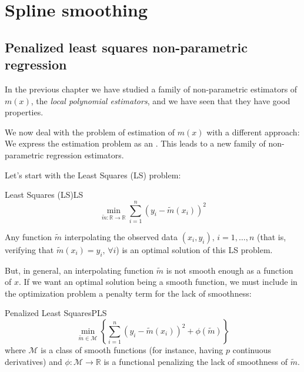 \chapter{Spline smoothing}

\section{Penalized least squares non-parametric regression}

In the previous chapter we have studied a family of non-parametric
estimators of $m(x)$, the \emph{local  polynomial estimators}, and
we have seen that they have good properties.

We now deal with the problem of estimation of $m(x)$ with a different
approach: We express the estimation problem as
an . This leads
to a new family of non-parametric regression estimators.

Let's start with the Least Squares (LS) problem:
\begin{problem}{Least Squares (LS)}{LS}
    \begin{equation*}
        \min_{\tilde m : \mathbb{R} \to \mathbb{R}}
            \sum_{i=1}^n \left(y_i - \tilde m(x_i)\right)^2
    \end{equation*}
\end{problem}

Any function $\tilde m$ interpolating the observed data $(x_i, y_i),\,i=1,\ldots,n$
(that is, verifying that $\tilde m(x_i) = y_i,\,\forall i$) is an optimal
solution of this LS problem.

But, in general, an interpolating function $\tilde m$ is not
smooth enough as a function of $x$. If we want an optimal
solution being a smooth function, we must include in the
optimization problem a penalty term for the lack of smoothness:
\begin{problem}{Penalized Least Squares}{PLS}
    \begin{equation*}
        \min_{\tilde m \in \mathcal M}
        \left\{
            \sum_{i=1}^n 
            \left(y_i - \tilde m(x_i)\right)^2
            + \phi(\tilde m)
        \right\}
    \end{equation*}
    where $\mathcal M$ is a class of smooth functions (for instance,
    having $p$ continuous derivatives) and $\phi : \mathcal M \to \mathbb{R}$ is
    a functional penalizing the lack of smoothness of $\tilde m$.
\end{problem}

